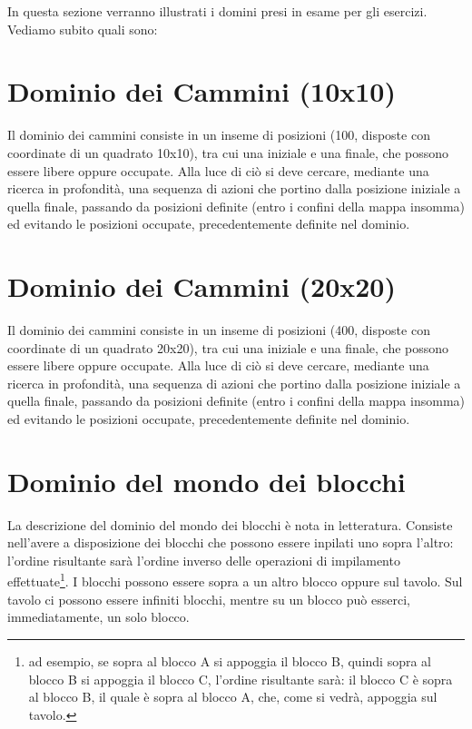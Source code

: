 In questa sezione verranno illustrati i domini presi in esame per gli esercizi. Vediamo subito quali sono:
\section{Dominio dei Cammini (10x10)} \label{sec:cammini:10x10}
Il dominio dei cammini consiste in un inseme di posizioni (100, disposte con coordinate di un quadrato 10x10), tra cui una iniziale e una finale, che possono essere libere oppure occupate. Alla luce di ciò si deve cercare, mediante una ricerca in profondità, una sequenza di azioni che portino dalla posizione iniziale a quella finale, passando da posizioni definite (entro i confini della mappa insomma) ed evitando le posizioni occupate, precedentemente definite nel dominio.
\section{Dominio dei Cammini (20x20)} \label{sec:cammini:20x20}
Il dominio dei cammini consiste in un inseme di posizioni (400, disposte con coordinate di un quadrato 20x20), tra cui una iniziale e una finale, che possono essere libere oppure occupate. Alla luce di ciò si deve cercare, mediante una ricerca in profondità, una sequenza di azioni che portino dalla posizione iniziale a quella finale, passando da posizioni definite (entro i confini della mappa insomma) ed evitando le posizioni occupate, precedentemente definite nel dominio.
\section{Dominio del mondo dei blocchi} \label{sec:blocchi}
La descrizione del dominio del mondo dei blocchi è nota in letteratura. Consiste nell'avere a disposizione dei blocchi che possono essere inpilati uno sopra l'altro: l'ordine risultante sarà l'ordine inverso delle operazioni di impilamento effettuate\footnote{ad esempio, se sopra al blocco A si appoggia il blocco B, quindi sopra al blocco B si appoggia il blocco C, l'ordine risultante sarà: il blocco C è sopra al blocco B, il quale è sopra al blocco A, che, come si vedrà, appoggia sul tavolo.}. I blocchi possono essere sopra a un altro blocco oppure sul tavolo. Sul tavolo ci possono essere infiniti blocchi, mentre su un blocco può esserci, immediatamente, un solo blocco.
